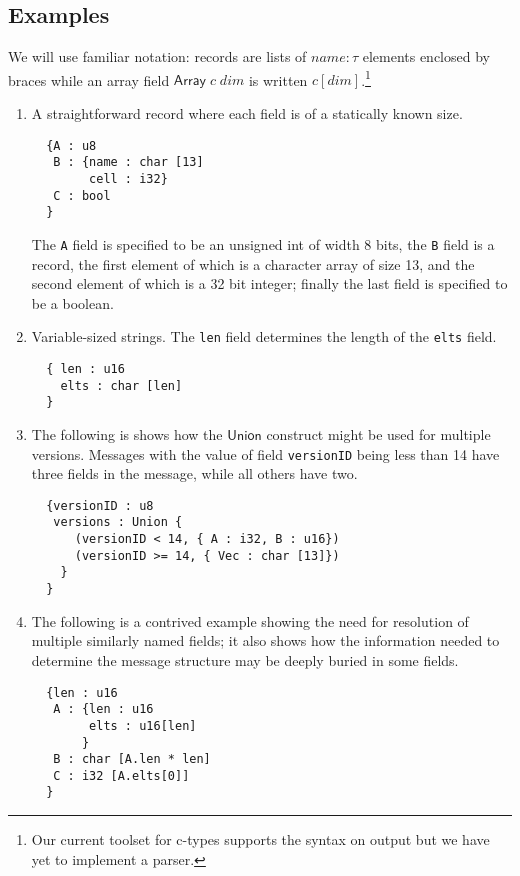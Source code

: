 \documentclass[svgnames]{llncs}
\newcommand{\konst}[1]{\ensuremath{\mathsf{#1}}}
\begin{document}
\subsection{Examples}

We will use familiar notation: records are lists of $\mathit{name} :
\tau$ elements enclosed by braces while an array field
$\konst{Array}\;c\;\mathit{dim}$ is written $c [\mathit{dim}]$.\footnote{ Our
current toolset for c-types supports the syntax on output but we have
yet to implement a parser.}

\begin{enumerate}

\item A straightforward record where each field is of a statically known size.

\begin{verbatim}
  {A : u8
   B : {name : char [13]
        cell : i32}
   C : bool
  }
\end{verbatim}

The \verb+A+ field is specified to be an unsigned int of width 8 bits,
the \verb+B+ field is a record, the first element of which is a
character array of size 13, and the second element of which is a 32
bit integer; finally the last field is specified to be a
boolean.

\item Variable-sized strings. The \verb+len+ field determines the
 length of the \verb+elts+ field.

\begin{verbatim}
  { len : u16
    elts : char [len]
  }
\end{verbatim}


\item The following is shows how the \konst{Union} construct might be
  used for multiple versions.  Messages with the value of field
  \verb+versionID+ being less than 14 have three fields in the message,
  while all others have two.

\begin{verbatim}
  {versionID : u8
   versions : Union {
      (versionID < 14, { A : i32, B : u16})
      (versionID >= 14, { Vec : char [13]})
    }
  }
\end{verbatim}

\item The following is a contrived example showing the need for
  resolution of multiple similarly named fields; it also shows how the
  information needed to determine the message structure may be deeply
  buried in some fields.

\begin{verbatim}
  {len : u16
   A : {len : u16
        elts : u16[len]
       }
   B : char [A.len * len]
   C : i32 [A.elts[0]]
  }
\end{verbatim}

\end{enumerate}
\end{document}
